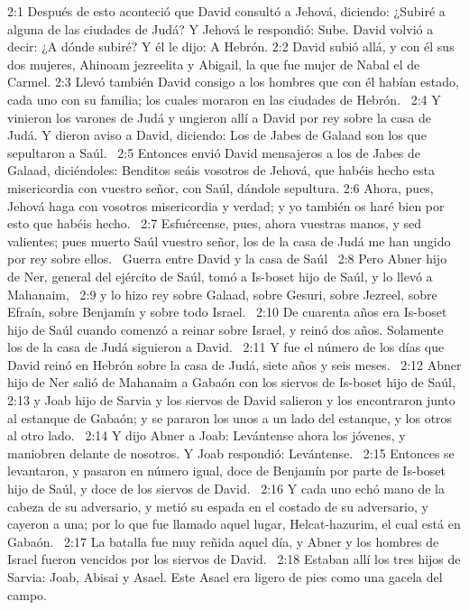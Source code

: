 2:1 Después de esto aconteció que David consultó a Jehová, diciendo: ¿Subiré a alguna de las ciudades de Judá? Y Jehová le respondió: Sube. David volvió a decir: ¿A dónde subiré? Y él le dijo: A Hebrón. 
2:2 David subió allá, y con él sus dos mujeres, Ahinoam jezreelita y Abigail, la que fue mujer de Nabal el de Carmel. 
2:3 Llevó también David consigo a los hombres que con él habían estado, cada uno con su familia; los cuales moraron en las ciudades de Hebrón.  
2:4 Y vinieron los varones de Judá y ungieron allí a David por rey sobre la casa de Judá. Y dieron aviso a David, diciendo: Los de Jabes de Galaad son los que sepultaron a Saúl.  
2:5 Entonces envió David mensajeros a los de Jabes de Galaad, diciéndoles: Benditos seáis vosotros de Jehová, que habéis hecho esta misericordia con vuestro señor, con Saúl, dándole sepultura. 
2:6 Ahora, pues, Jehová haga con vosotros misericordia y verdad; y yo también os haré bien por esto que habéis hecho.  
2:7 Esfuércense, pues, ahora vuestras manos, y sed valientes; pues muerto Saúl vuestro señor, los de la casa de Judá me han ungido por rey sobre ellos.  
Guerra entre David y la casa de Saúl  
2:8 Pero Abner hijo de Ner, general del ejército de Saúl, tomó a Is-boset hijo de Saúl, y lo llevó a Mahanaim,  
2:9 y lo hizo rey sobre Galaad, sobre Gesuri, sobre Jezreel, sobre Efraín, sobre Benjamín y sobre todo Israel.  
2:10 De cuarenta años era Is-boset hijo de Saúl cuando comenzó a reinar sobre Israel, y reinó dos años. Solamente los de la casa de Judá siguieron a David.  
2:11 Y fue el número de los días que David reinó en Hebrón sobre la casa de Judá, siete años y seis meses.  
2:12 Abner hijo de Ner salió de Mahanaim a Gabaón con los siervos de Is-boset hijo de Saúl,  
2:13 y Joab hijo de Sarvia y los siervos de David salieron y los encontraron junto al estanque de Gabaón; y se pararon los unos a un lado del estanque, y los otros al otro lado.  
2:14 Y dijo Abner a Joab: Levántense ahora los jóvenes, y maniobren delante de nosotros. Y Joab respondió: Levántense.  
2:15 Entonces se levantaron, y pasaron en número igual, doce de Benjamín por parte de Is-boset hijo de Saúl, y doce de los siervos de David.  
2:16 Y cada uno echó mano de la cabeza de su adversario, y metió su espada en el costado de su adversario, y cayeron a una; por lo que fue llamado aquel lugar, Helcat-hazurim, el cual está en Gabaón.  
2:17 La batalla fue muy reñida aquel día, y Abner y los hombres de Israel fueron vencidos por los siervos de David.  
2:18 Estaban allí los tres hijos de Sarvia: Joab, Abisai y Asael. Este Asael era ligero de pies como una gacela del campo.  
